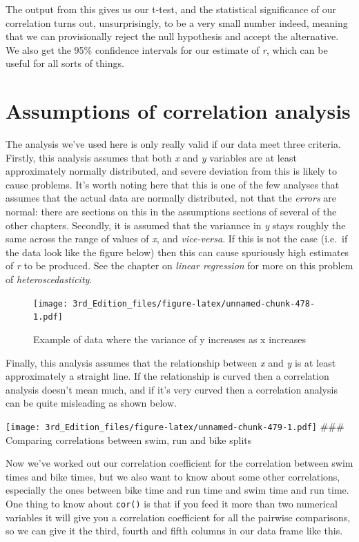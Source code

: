 \documentclass[
]{book}
\begin{document}
The output from this gives us our t-test, and the statistical significance of our correlation turns out, unsurprisingly, to be a very small number indeed, meaning that we can provisionally reject the null hypothesis and accept the alternative. We also get the 95\% confidence intervals for our estimate of \emph{r}, which can be useful for all sorts of things.

\hypertarget{assumptions-of-correlation-analysis}{%
\section{Assumptions of correlation analysis}\label{assumptions-of-correlation-analysis}}

The analysis we've used here is only really valid if our data meet three criteria. Firstly, this analysis assumes that both \emph{x} and \emph{y} variables are at least approximately normally distributed, and severe deviation from this is likely to cause problems. It's worth noting here that this is one of the few analyses that assumes that the actual data are normally distributed, not that the \emph{errors} are normal: there are sections on this in the assumptions sections of several of the other chapters. Secondly, it is assumed that the variannce in \emph{y} stays roughly the same across the range of values of \emph{x}, and \emph{vice-versa}. If this is not the case (i.e.~if the data look like the figure below) then this can cause spuriously high estimates of \emph{r} to be produced. See the chapter on \emph{linear regression} for more on this problem of \emph{heteroscedasticity}.

\begin{figure}
\centering
\texttt{[image: 3rd\_Edition\_files/figure-latex/unnamed-chunk-478-1.pdf]}
\caption{\label{fig:unnamed-chunk-478}Example of data where the variance of y increases as x increases}
\end{figure}

Finally, this analysis assumes that the relationship between \emph{x} and \emph{y} is at least approximately a straight line. If the relationship is curved then a correlation analysis doesn't mean much, and if it's very curved then a correlation analysis can be quite misleading as shown below.

\texttt{[image: 3rd\_Edition\_files/figure-latex/unnamed-chunk-479-1.pdf]}
\#\#\# Comparing correlations between swim, run and bike splits

Now we've worked out our correlation coefficient for the correlation between swim times and bike times, but we also want to know about some other correlations, especially the ones between bike time and run time and swim time and run time. One thing to know about \texttt{cor()} is that if you feed it more than two numerical variables it will give you a correlation coefficient for all the pairwise comparisons, so we can give it the third, fourth and fifth columns in our data frame like this.
\end{document}

